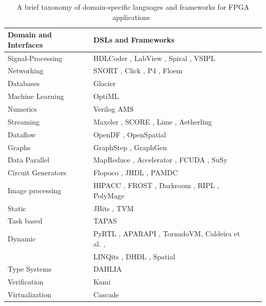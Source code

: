 \begin {table} [h]
	\begin{center}
		\caption {A brief taxonomy of domain-specific languages and frameworks for FPGA applications~\label{DSLs}}
		\begin{tabular}{ | l | l | l | p{0.1cm}|}
			\hline
			\textbf{Domain and Interfaces} &  \textbf{DSLs and Frameworks} \\ \hline  
			Signal-Processing &  HDLCoder \cite{dsl}, LabView \cite{dsl}, Spiral \cite{SPIRAL}, VSIPL \cite{VSIPL}  \\            \hline
			Networking  &  SNORT \cite{snort}, Click \cite{click}, P4 \cite{p4lang}, Floem \cite{floem}\\            \hline
			Databases & Glacier \cite{glacier}  \\ \hline
			Machine Learning & OptiML \cite{optiML}  \\ \hline 
			Numerics &Verilog
			AMS \cite{verilogAMS}  \\            \hline
			Streaming & Maxeler \cite{maxeler}, SCORE \cite{score}, Lime \cite{lime}, Aetherling \cite{aetherling}  \\            \hline
			Dataflow & OpenDF \cite{openDF}, OpenSpatial \cite{dsl}  \\            \hline
			Graphs & GraphStep \cite{graphstep}, GraphGen \cite{graphgen}  \\            \hline
			Data Parallel & MapReduce \cite{dsl}, Accelerator \cite{accelerator}, FCUDA \cite{fcuda}, SuSy \cite{susy}  \\            \hline
			Circuit Generators & Flopoco \cite{flopoco}, JHDL \cite{jhdl}, PAMDC \cite{pmdc}  \\            \hline
			Image processing & HIPACC \cite{hipacc}, FROST \cite{frost}, Darkroom \cite{darkroom}, RIPL \cite{ripl}, PolyMage \cite{polymage} \\            \hline
 			Static &  JBits \cite{jbits}, TVM \cite{tvm}\\            \hline
 			Task based & TAPAS \cite{tapas} \\            \hline
				Dynamic &  PyRTL \cite{pyrtl}, APARAPI \cite{arapa}, TornadoVM\cite{tornado}, Caldeira et al. \cite{caldeira}, \\ & LINQits \cite{linqits}, DHDL \cite{dhdl}, Spatial \cite{spatial} \\            \hline
		Type Systems & DAHLIA \cite{dahlia}\\ \hline
		Verification & Kami \cite{kami} \\ \hline
		Virtualization & Cascade \cite{cascade} \\ \hline
		\end{tabular}
	\end{center}
\end {table}

